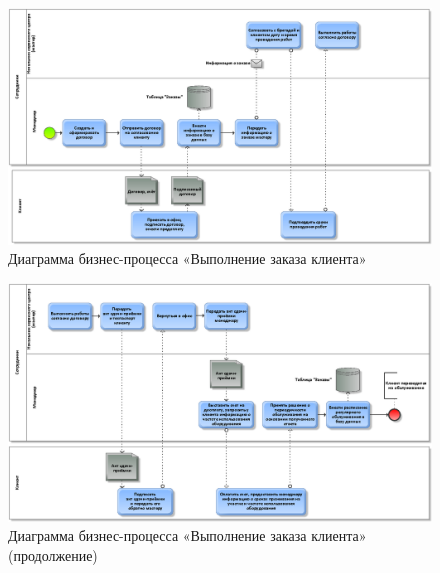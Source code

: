 \documentclass[a4paper,12pt]{article}
\begin{document}
\begin{figure}[h]
    \centering
    \includegraphics[width=\linewidth]{exec1.png}
    \caption{Диаграмма бизнес-процесса «Выполнение заказа клиента»}
    \label{fig:exec1}
\end{figure}
\begin{figure}[h]
    \centering
    \includegraphics[width=\linewidth]{exec2.png}
    \caption{Диаграмма бизнес-процесса «Выполнение заказа клиента» (продолжение)}
    \label{fig:exec2}
\end{figure}
\end{document}
